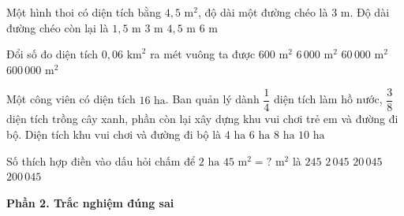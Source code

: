 \begin{ex} %
Một hình thoi có diện tích bằng $4{,}5\text{ m}^2$, độ dài một đường chéo là $3\text{ m}$. Độ dài đường chéo còn lại là
\choice
{$1{,}5\text{ m}$}
{\True $3\text{ m}$}
{$4{,}5\text{ m}$}
{$6\text{ m}$}
\end{ex}

\begin{ex} %
Đổi số đo diện tích $0{,}06\text{ km}^2$ ra mét vuông ta được
\choice
{$600\text{ m}^2$}
{$6\,000\text{ m}^2$}
{\True $60\,000\text{ m}^2$}
{$600\,000\text{ m}^2$}
\end{ex}

\begin{ex} %
Một công viên có diện tích $16\text{ ha}$. Ban quản lý dành $\dfrac{1}{4}$ diện tích làm hồ nước, $\dfrac{3}{8}$ diện tích trồng cây xanh, phần còn lại xây dựng khu vui chơi trẻ em và đường đi bộ. Diện tích khu vui chơi và đường đi bộ là
\choice
{$4\text{ ha}$}
{\True $6\text{ ha}$}
{$8\text{ ha}$}
{$10\text{ ha}$}
\end{ex}

\begin{ex} %
Số thích hợp điền vào dấu hỏi chấm để $2\text{ ha } 45\text{ m}^2 = ?\text{ m}^2$ là
\choice
{$245$}
{$2\,045$}
{\True $20\,045$}
{$200\,045$}
\end{ex}

\textbf{Phần 2. Trắc nghiệm đúng sai}

